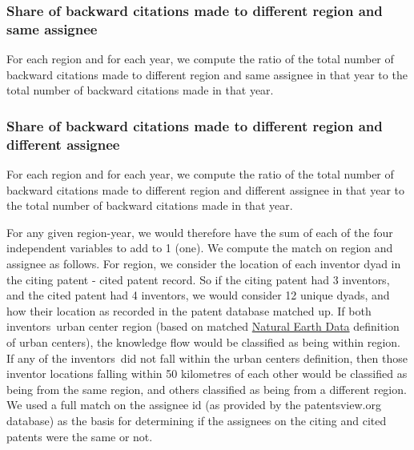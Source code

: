 \documentclass[12pt,letterpaper]{article}
\begin{document}
\subsubsection{Share of backward citations made to different region and same assignee}
For each region and for each year, we compute the ratio of the total number of backward citations made to different region and same assignee in that year to the total number of backward citations made in that year.
\subsubsection{Share of backward citations made to different region and different assignee}
For each region and for each year, we compute the ratio of the total number of backward citations made to different region and different assignee in that year to the total number of backward citations made in that year.\par

For any given region-year, we would therefore have the sum of each of the four independent variables to add to 1 (one). We compute the match on region and assignee as follows. For region, we consider the location of each inventor dyad in the citing patent - cited patent record. So if the citing patent had 3 inventors, and the cited patent had 4 inventors, we would consider 12 unique dyads, and how their location as recorded in the patent database matched up. If both inventors\textquotesingle \ urban center region (based on  matched \href{http://www.naturalearthdata.com/downloads/10m-cultural-vectors/}{Natural Earth Data} definition of urban centers), the knowledge flow would be classified as being within region. If any of the inventors\textquotesingle \ did not fall within the urban centers definition, then those inventor locations falling within 50 kilometres of each other would be classified as being from the same region, and others classified as being from a different region. We used a full match on the assignee id (as provided by the patentsview.org database) as the basis for determining if the assignees on the citing and cited patents were the same or not.
\end{document}
